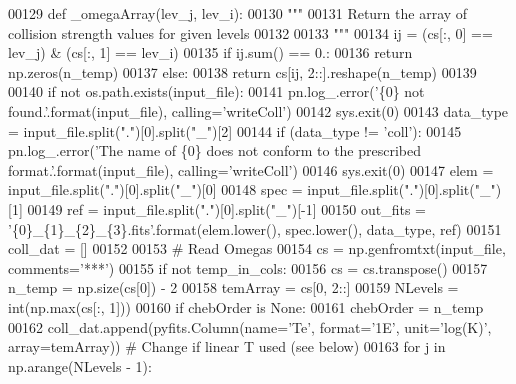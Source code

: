 \begin{DoxyCode}
00129     \textcolor{keyword}{def }\_omegaArray(lev\_j, lev\_i):
00130         \textcolor{stringliteral}{"""}
00131 \textcolor{stringliteral}{        Return the array of collision strength values for given levels}
00132 \textcolor{stringliteral}{ }
00133 \textcolor{stringliteral}{        """}       
00134         ij = (cs[:, 0] == lev\_j) & (cs[:, 1] == lev\_i)
00135         \textcolor{keywordflow}{if} ij.sum() == 0.:
00136             \textcolor{keywordflow}{return} np.zeros(n\_temp)
00137         \textcolor{keywordflow}{else}:
00138             \textcolor{keywordflow}{return} cs[ij, 2::].reshape(n\_temp)
00139 
00140     \textcolor{keywordflow}{if} \textcolor{keywordflow}{not} os.path.exists(input\_file):
00141         pn.log\_.error(\textcolor{stringliteral}{'\{0\} not found.'}.format(input\_file), calling=\textcolor{stringliteral}{'writeColl'})
00142         sys.exit(0)
00143     data\_type = input\_file.split(\textcolor{stringliteral}{"."})[0].split(\textcolor{stringliteral}{"\_"})[2]
00144     \textcolor{keywordflow}{if} (data\_type != \textcolor{stringliteral}{'coll'}):
00145         pn.log\_.error(\textcolor{stringliteral}{'The name of \{0\} does not conform to the prescribed format.'}.format(input\_file), 
      calling=\textcolor{stringliteral}{'writeColl'})
00146         sys.exit(0)
00147     elem = input\_file.split(\textcolor{stringliteral}{"."})[0].split(\textcolor{stringliteral}{"\_"})[0]
00148     spec = input\_file.split(\textcolor{stringliteral}{"."})[0].split(\textcolor{stringliteral}{"\_"})[1]
00149     ref = input\_file.split(\textcolor{stringliteral}{"."})[0].split(\textcolor{stringliteral}{"\_"})[-1]
00150     out\_fits = \textcolor{stringliteral}{'\{0\}\_\{1\}\_\{2\}\_\{3\}.fits'}.format(elem.lower(), spec.lower(), data\_type, ref)
00151     coll\_dat = []
00152 
00153     \textcolor{comment}{# Read Omegas}
00154     cs = np.genfromtxt(input\_file, comments=\textcolor{stringliteral}{'***'})
00155     \textcolor{keywordflow}{if} \textcolor{keywordflow}{not} temp\_in\_cols:
00156         cs = cs.transpose()
00157     n\_temp = np.size(cs[0]) - 2
00158     temArray = cs[0, 2::]
00159     NLevels = int(np.max(cs[:, 1]))
00160     \textcolor{keywordflow}{if} chebOrder \textcolor{keywordflow}{is} \textcolor{keywordtype}{None}:
00161         chebOrder = n\_temp
00162     coll\_dat.append(pyfits.Column(name=\textcolor{stringliteral}{'Te'}, format=\textcolor{stringliteral}{'1E'}, unit=\textcolor{stringliteral}{'log(K)'}, array=temArray)) \textcolor{comment}{# Change if
       linear T used (see below)}
00163     \textcolor{keywordflow}{for} j \textcolor{keywordflow}{in} np.arange(NLevels - 1):

\end{DoxyCode}
